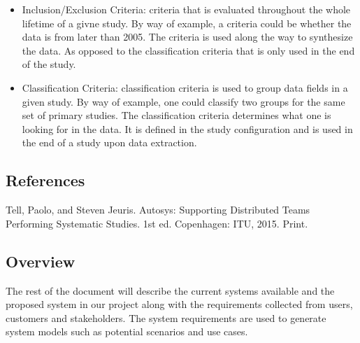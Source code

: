 \begin{itemize}
	  \item Inclusion/Exclusion Criteria: criteria that is evaluated throughout the whole lifetime of a givne study. By way of example, a criteria could be whether the data is from later than 2005. The criteria is used along the way to synthesize the data. As opposed to the classification criteria that is only used in the end of the study. 
	  \item Classification Criteria: classification criteria is used to group data fields in a given study. By way of example, one could classify two groups for the same set of primary studies. The classification criteria determines what one is looking for in the data. It is defined in the study configuration and is used in the end of a study upon data extraction. 
	\end{itemize}
	
\subsection{References}
Tell, Paolo, and Steven Jeuris. Autosys: Supporting Distributed Teams Performing Systematic Studies. 1st ed. Copenhagen: ITU, 2015. Print.

\subsection{Overview}
The rest of the document will describe the current systems available and the proposed system in our project along with the requirements collected from users, customers and stakeholders. The system requirements are used to generate system models such as potential scenarios and use cases. 
